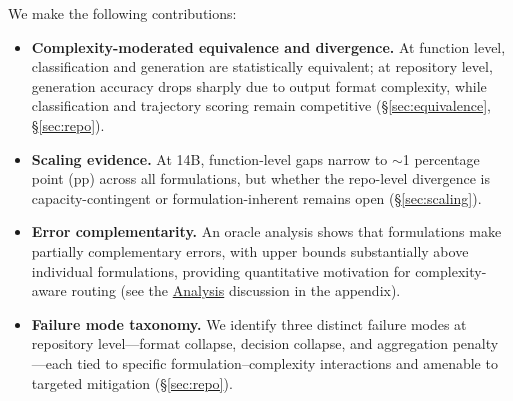 We make the following contributions:

\begin{itemize}[leftmargin=*,itemsep=2pt]
\item \textbf{Complexity-moderated equivalence and divergence.} At function level, classification and generation are statistically equivalent; at repository level, generation accuracy drops sharply due to output format complexity, while classification and trajectory scoring remain competitive (\S\ref{sec:equivalence}, \S\ref{sec:repo}).

\item \textbf{Scaling evidence.} At 14B, function-level gaps narrow to ${\sim}$1 percentage point (pp) across all formulations, but whether the repo-level divergence is capacity-contingent or formulation-inherent remains open (\S\ref{sec:scaling}).

\item \textbf{Error complementarity.} An oracle analysis shows that formulations make partially complementary errors, with upper bounds substantially above individual formulations, providing quantitative motivation for complexity-aware routing (see the \hyperref[sec:analysis]{Analysis} discussion in the appendix).

\item \textbf{Failure mode taxonomy.} We identify three distinct failure modes at repository level---format collapse, decision collapse, and aggregation penalty---each tied to specific formulation--complexity interactions and amenable to targeted mitigation (\S\ref{sec:repo}).
\end{itemize}
